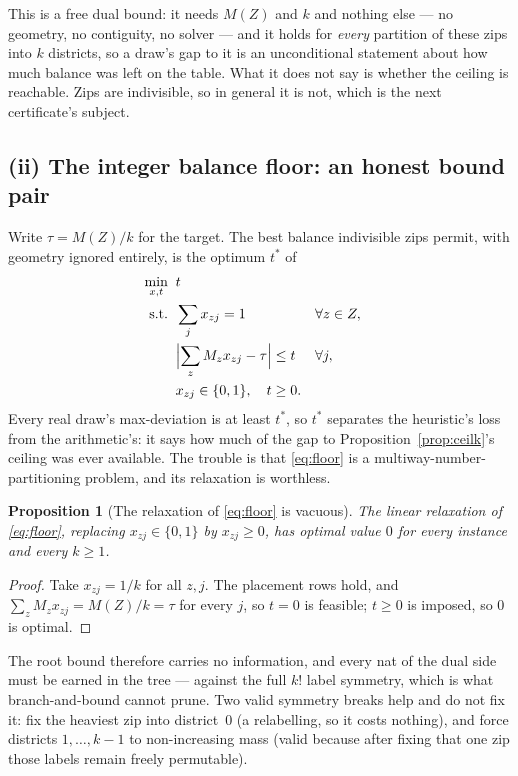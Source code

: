 \documentclass[11pt]{article}
\newtheorem{prop}{Proposition}
\theoremstyle{definition}
\begin{document}
This is a free dual bound: it needs $M(Z)$ and $k$ and nothing else --- no geometry, no
contiguity, no solver --- and it holds for \emph{every} partition of these zips into $k$
districts, so a draw's gap to it is an unconditional statement about how much balance was
left on the table. What it does not say is whether the ceiling is reachable. Zips are
indivisible, so in general it is not, which is the next certificate's subject.

\subsection{(ii) The integer balance floor: an honest bound pair}

Write $\tau=M(Z)/k$ for the target. The best balance indivisible zips permit, with geometry
ignored entirely, is the optimum $t^\ast$ of
\begin{equation}\label{eq:floor}
\begin{aligned}
\min_{x,t}\;\; & t\\
\text{s.t.}\;\;
& \sum_{j} x_{zj}=1 && \forall z\in Z,\\
& \Bigl\lvert\sum_z M_z x_{zj}-\tau\Bigr\rvert \le t && \forall j,\\
& x_{zj}\in\{0,1\},\quad t\ge0 .
\end{aligned}
\end{equation}
Every real draw's max-deviation is at least $t^\ast$, so $t^\ast$ separates the heuristic's
loss from the arithmetic's: it says how much of the gap to Proposition~\ref{prop:ceilk}'s
ceiling was ever available. The trouble is that \eqref{eq:floor} is a
multiway-number-partitioning problem, and its relaxation is worthless.

\begin{prop}[The relaxation of \eqref{eq:floor} is vacuous]\label{prop:vacuous}
The linear relaxation of \eqref{eq:floor}, replacing $x_{zj}\in\{0,1\}$ by $x_{zj}\ge0$, has
optimal value $0$ for every instance and every $k\ge1$.
\end{prop}

\begin{proof}
Take $x_{zj}=1/k$ for all $z,j$. The placement rows hold, and
$\sum_z M_z x_{zj}=M(Z)/k=\tau$ for every $j$, so $t=0$ is feasible; $t\ge0$ is imposed, so
$0$ is optimal.
\end{proof}

The root bound therefore carries no information, and every nat of the dual side must be
earned in the tree --- against the full $k!$ label symmetry, which is what branch-and-bound
cannot prune. Two valid symmetry breaks help and do not fix it: fix the heaviest zip into
district~$0$ (a relabelling, so it costs nothing), and force districts $1,\dots,k-1$ to
non-increasing mass (valid because after fixing that one zip those labels remain freely
permutable).
\end{document}
